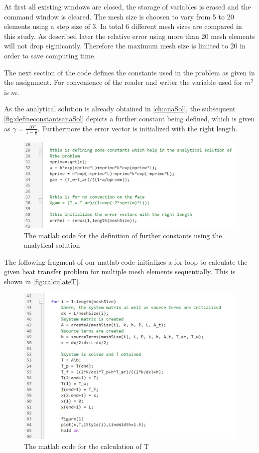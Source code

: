 At first all existing windows are closed, the storage of variables is erased and the command window is cleared. 
The mesh size is choosen to vary from 5 to 20 elements using a step size of 3. In total 6 different mesh sizes are compared in this study. As described later the relative error using more than 20 mesh elements will not drop siginicantly. Therefore the maximum mesh size is limited to 20 in order to save computing time. 

The next section of the code defines the constants used in the problem as given in the assignment. For convenience of the reader and writer the variable used for $m^2$ is $m$.  

As the analytical solution is already obtained in \autoref{ch:anaSol}, the subsequent \autoref{fig:defineconstantsanaSol} depicts a further constant being defined, which is given as $\gamma = \frac{\Delta T}{1-\frac{a}{b}}$. Furthermore the error vector is initialized with the right length. 


\begin{figure}[H]
    \centering
    \includegraphics[width=.8\textwidth]{figures/define_anaSol_constants.jpg}
    \caption{The matlab code for the definition of further constants using the analytical solution}
    \label{fig:defineconstantsanaSol}
\end{figure}



The following fragment of our matlab code initializes a for loop to calculate the given heat transfer problem for multiple mesh elements sequentially. This is shown in \autoref{fig:calculateT}.


\begin{figure}[H]
    \centering
    \includegraphics[width=.8\textwidth]{figures/begin_for_loop_calculate_T.jpg}
    \caption{The matlab code for the calculation of T}
    \label{fig:calculateT}
\end{figure}


